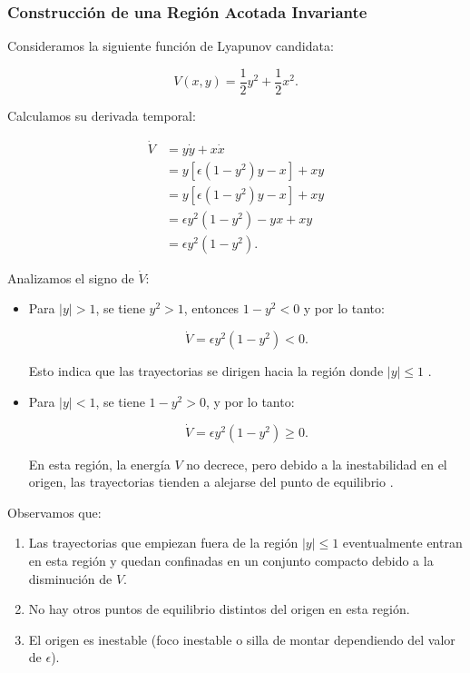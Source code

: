 \subsubsection{Construcción de una Región Acotada Invariante}

Consideramos la siguiente función de Lyapunov candidata:

\begin{equation}
    V(x, y) = \dfrac{1}{2} y^2 + \dfrac{1}{2} x^2.
\end{equation}

Calculamos su derivada temporal:

\begin{align}
    \dot{V} &= y \dot{y} + x \dot{x} \\
    &= y \left[ \epsilon \left(1 - y^2\right) y - x \right] + x y \\
    &= y \left[ \epsilon \left(1 - y^2\right) y - x \right] + x y \\
    &= \epsilon y^2 \left(1 - y^2\right) - y x + x y \\
    &= \epsilon y^2 \left(1 - y^2\right).
\end{align}

Analizamos el signo de \(\dot{V}\):

\begin{itemize}
    \item Para \( |y| > 1 \), se tiene \( y^2 > 1 \), entonces \( 1 - y^2 < 0 \) y por lo tanto:

    \begin{equation}
        \dot{V} = \epsilon y^2 (1 - y^2) < 0.
    \end{equation}

    Esto indica que las trayectorias se dirigen hacia la región donde \( |y| \leq 1 \) \cite{hahn1967stability}.

    \item Para \( |y| < 1 \), se tiene \( 1 - y^2 > 0 \), y por lo tanto:

    \begin{equation}
        \dot{V} = \epsilon y^2 (1 - y^2) \geq 0.
    \end{equation}

    En esta región, la energía \( V \) no decrece, pero debido a la inestabilidad en el origen, las trayectorias tienden a alejarse del punto de equilibrio \cite{lasalle1961stability}.
\end{itemize}

Observamos que:

\begin{enumerate}
    \item Las trayectorias que empiezan fuera de la región \( |y| \leq 1 \) eventualmente entran en esta región y quedan confinadas en un conjunto compacto debido a la disminución de \( V \).

    \item No hay otros puntos de equilibrio distintos del origen en esta región.

    \item El origen es inestable (foco inestable o silla de montar dependiendo del valor de \(\epsilon\)).
\end{enumerate}

